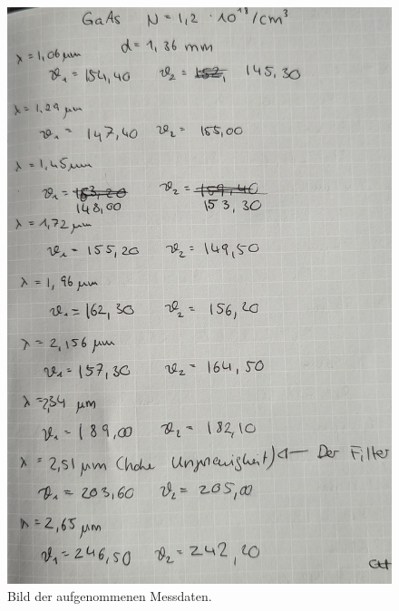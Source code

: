 \begin{figure}[H]
              \centering
              \includegraphics[height=\textheight]{content/v46_pictures/messdaten_3.jpg}
              \caption{Bild der aufgenommenen Messdaten.}
              \label{fig:messdatenc}
\end{figure}

